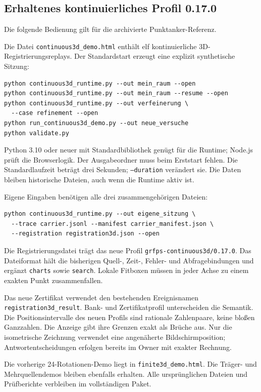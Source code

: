 \documentclass[11pt,a4paper]{article}
\begin{document}
\clearpage
\subsection{Erhaltenes kontinuierliches Profil 0.17.0}
Die folgende Bedienung gilt für die archivierte Punktanker-Referenz.


Die Datei \texttt{continuous3d\_demo.html} enthält elf kontinuierliche
3D-Registrierungsreplays. Der Standardstart erzeugt eine
explizit synthetische Sitzung:
\begin{lstlisting}
python continuous3d_runtime.py --out mein_raum --open
python continuous3d_runtime.py --out mein_raum --resume --open
python continuous3d_runtime.py --out verfeinerung \
  --case refinement --open
python run_continuous3d_demo.py --out neue_versuche
python validate.py
\end{lstlisting}
Python 3.10 oder neuer mit Standardbibliothek genügt für die
Runtime; Node.js prüft die Browserlogik. Der Ausgabeordner muss
beim Erststart fehlen. Die Standardlaufzeit beträgt drei Sekunden;
\texttt{--duration} verändert sie. Die Daten bleiben historische
Dateien, auch wenn die Runtime aktiv ist.

Eigene Eingaben benötigen alle drei zusammengehörigen Dateien:
\begin{lstlisting}
python continuous3d_runtime.py --out eigene_sitzung \
  --trace carrier.jsonl --manifest carrier_manifest.json \
  --registration registration3d.json --open
\end{lstlisting}
Die Registrierungsdatei trägt das neue Profil
\texttt{grfps-continuous3d/0.17.0}. Das Dateiformat hält die
bisherigen Quell-, Zeit-, Fehler- und Abfragebindungen und ergänzt
\texttt{charts} sowie \texttt{search}. Lokale Fitboxen müssen in
jeder Achse zu einem exakten Punkt zusammenfallen.

Das neue Zertifikat verwendet den bestehenden Ereignisnamen
\texttt{registration3d\_result}. Bank- und Zertifikatprofil
unterscheiden die Semantik. Die Positionsintervalle des neuen
Profils sind rationale Zahlenpaare, keine bloßen Ganzzahlen.
Die Anzeige gibt ihre Grenzen exakt als Brüche aus. Nur die
isometrische Zeichnung verwendet eine angenäherte Bildschirmposition;
Antwortentscheidungen erfolgen bereits im Owner mit exakter Rechnung.

Die vorherige 24-Rotationen-Demo liegt in
\texttt{finite3d\_demo.html}. Die Träger- und Mehrquellendemos
bleiben ebenfalls erhalten. Alle ursprünglichen Dateien und
Prüfberichte verbleiben im vollständigen Paket.
\end{document}
